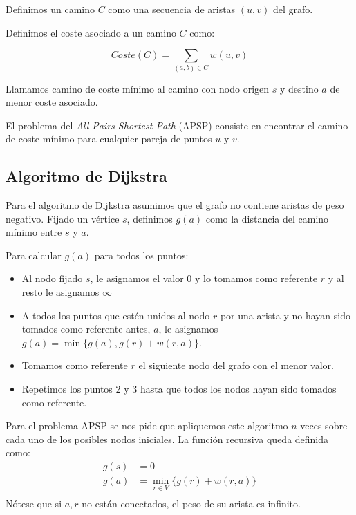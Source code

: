 \documentclass[a4paper, 11pt]{article} %
\begin{document}
    Definimos un camino $C$ como una secuencia de aristas $(u,v)$ del grafo.
    
    Definimos el coste asociado a un camino $C$ como:
    
    \begin{equation}
      Coste(C) = \sum_{(a,b) \in C} w(u,v)
    \end{equation}
     
    Llamamos camino de coste mínimo al camino con nodo origen $s$ y destino $a$ de menor coste asociado.
    
    El problema del \textit{All Pairs Shortest Path} (APSP) consiste en encontrar el camino de coste mínimo para cualquier pareja de puntos $u$ y $v$.
    
  \subsection{Algoritmo de Dijkstra}
    Para el algoritmo de Dijkstra asumimos que el grafo no contiene aristas de peso negativo.
    Fijado un vértice $s$, definimos $g(a)$ como la distancia del camino mínimo entre $s$ y $a$.
    
    Para calcular $g(a)$ para todos los puntos:
    \begin{itemize}
      \item Al nodo fijado $s$, le asignamos el valor 0 y lo tomamos como referente $r$ y al resto le asignamos $\infty$
      \item A todos los puntos que estén unidos al nodo $r$  por una
      arista y no hayan sido tomados como referente antes, $a$, le asignamos $g(a) = \min \{g(a), g(r) + w(r,a)\}$.
      \item Tomamos como referente $r$ el siguiente nodo del grafo con el menor valor.
      \item Repetimos los puntos 2 y 3 hasta que todos los nodos hayan sido tomados como referente.
    \end{itemize}
    
    Para el problema APSP se nos pide que apliquemos este algoritmo $n$ veces sobre cada uno
    de los posibles nodos iniciales. La función recursiva queda definida como:
    \begin{equation} 
      \begin{split}
	g(s)  &=  0 \\
	g(a)  &=  \min_{r \in V} \{g(r) + w(r,a)\} \\
      \end{split}
    \end{equation}
    Nótese que si $a,r$ no están conectados, el peso de su arista es infinito.
  
\end{document}
